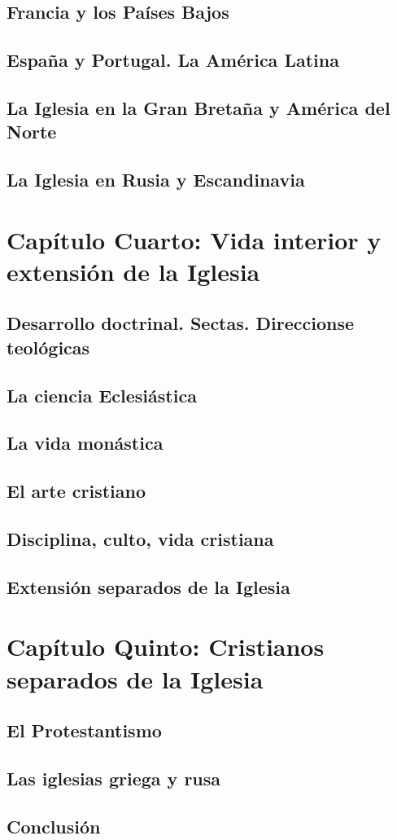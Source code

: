 \raggedbottom{} \documentclass[12pt, a4paper]{book}
\begin{document}
\section{Francia y los Países Bajos}
\section{España y Portugal. La América Latina}
\section{La Iglesia en la Gran Bretaña y América del Norte}
\section{La Iglesia en Rusia y Escandinavia}
\chapter{Capítulo Cuarto: Vida interior y extensión de la Iglesia}
\section{Desarrollo doctrinal. Sectas. Direccionse teológicas}
\section{La ciencia Eclesiástica}
\section{La vida monástica}
\section{El arte cristiano}
\section{Disciplina, culto, vida cristiana}
\section{Extensión separados de la Iglesia}
\chapter{Capítulo Quinto: Cristianos separados de la Iglesia}
\section{El Protestantismo}
\section{Las iglesias griega y rusa}
\section{Conclusión}
\printbibliography[heading=bibintoc]
\end{document}
